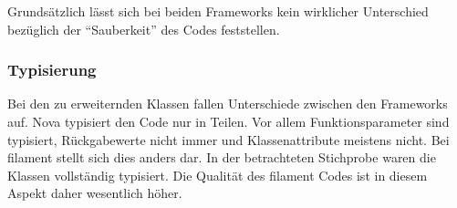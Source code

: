Grundsätzlich lässt sich bei beiden Frameworks kein wirklicher Unterschied bezüglich der \enquote{Sauberkeit} des Codes feststellen.

\newpage

\subsubsection{Typisierung}
Bei den zu erweiternden Klassen fallen Unterschiede zwischen den Frameworks auf.
Nova typisiert den Code nur in Teilen.
Vor allem Funktionsparameter sind typisiert, Rückgabewerte nicht immer und Klassenattribute meistens nicht.
Bei filament stellt sich dies anders dar.
In der betrachteten Stichprobe waren die Klassen vollständig typisiert.
Die Qualität des filament Codes ist in diesem Aspekt daher wesentlich höher.

